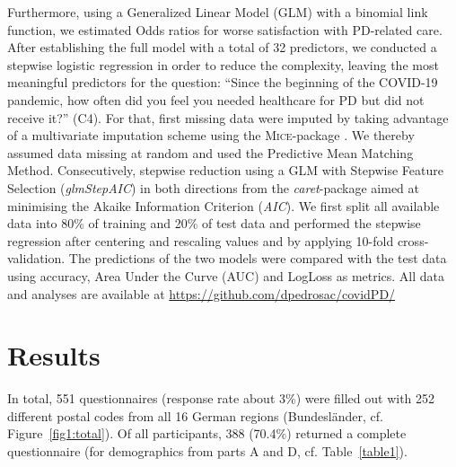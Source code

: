 \documentclass[a4paper,oneside,11pt,english]{scrartcl}
\begin{document}
Furthermore, using a Generalized Linear Model (\textsc{GLM}) with a binomial link function, we estimated Odds ratios for worse satisfaction with \textsc{PD}-related care. After establishing the full model with a total of 32 predictors, we conducted a stepwise logistic regression in order to reduce the complexity, leaving the most meaningful predictors for the question: ``Since the beginning of the \textsc{COVID}-19 pandemic, how often did you feel you needed healthcare for \textsc{PD} but did not receive it?'' (C4). For that, first missing data were imputed by taking advantage of a multivariate imputation scheme using the \textsc{Mice}-package \cite{vanbuuren2011}. We thereby assumed data missing at random and used the Predictive Mean Matching Method. Consecutively, stepwise reduction using a \textsc{GLM} with Stepwise Feature Selection (\textit{glmStepAIC}) in both directions from the \textit{caret}-package \cite{kuhn2008} aimed at minimising the Akaike Information Criterion (\textit{AIC}). We first split all available data into 80\% of training and 20\% of test data and performed the stepwise regression after centering and rescaling values and by applying 10-fold cross-validation. The predictions of the two models were compared with the test data using accuracy, Area Under the Curve (\textsc{AUC}) and LogLoss as metrics. All data and analyses are available at \url{https://github.com/dpedrosac/covidPD/}

\newpage


\section*{Results}
In total, 551 questionnaires (response rate about 3\%) were filled out with 252 different postal codes from all 16 German regions (Bundesländer, cf. Figure~\ref{fig1:total}). Of all participants, 388 (70.4$\%$) returned a complete questionnaire (for demographics from parts A and D, cf. Table~\ref{table1}).
\end{document}
